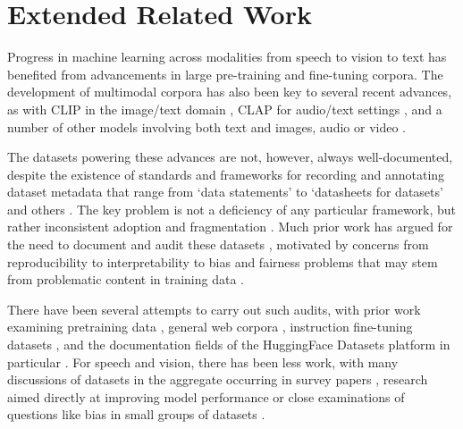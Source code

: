 \section{Extended Related Work}
\label{app:related-work}
Progress in machine learning across modalities from speech \citep{radford2023robust} to vision \citep{dosovitskiy2021image} to text \citep{browngpt3, weifinetuned} has benefited from advancements in large pre-training and fine-tuning corpora. The development of multimodal corpora has also been key to several recent advances, as with CLIP in the image/text domain \cite{clip_radford2021learning}, CLAP for audio/text settings \cite{elizalde2022clap}, and a number of other models involving both text and images, audio or video \citep{radford2023robust, ramirez2024anatomy, singerMakeVideoTextVideoGeneration2022, rameshHierarchicalTextConditionalImage2022}.

The datasets powering these advances are not, however, always well-documented, despite the existence of standards and frameworks for recording and annotating dataset metadata that range from `data statements' \citep{bender-friedman-2018-data} to `datasheets for datasets' \citep{gebru2021datasheets} and others \citep{mitchell2019model}. The key problem is not a deficiency of any particular framework, but rather inconsistent adoption and fragmentation \citep{Longpre2024Data}. Much prior work has argued for the need to document and audit these datasets \citep{rogers-2021-changing, paullada2021data}, motivated by concerns from reproducibility \citep{kapoor2022leakage} to interpretability \citep{longpre2023pretrainers} to bias and fairness problems that may stem from problematic content in training data \citep{birhane2021multimodal}. 

There have been several attempts to carry out such audits, with prior work examining pretraining data \citep{longpre2024consent}, general web corpora \citep{gao2020pile, dodge2021documenting}, instruction fine-tuning datasets \citep{longpre2023data}, and the documentation fields of the HuggingFace Datasets platform in particular \citep{yang2024navigatingdatasetdocumentationsai}. For speech and vision, there has been less work, with many discussions of datasets in the aggregate occurring in survey papers \citep{SchiappaSSLV2023, chaquetVideoDatasetSurvey2013}, research aimed directly at improving model performance \cite{GadreDataComp2023} or close examinations of questions like bias in small groups of datasets \citep{buolamwiniGenderShades2018,romanou2024includeevaluatingmultilinguallanguage}. 

